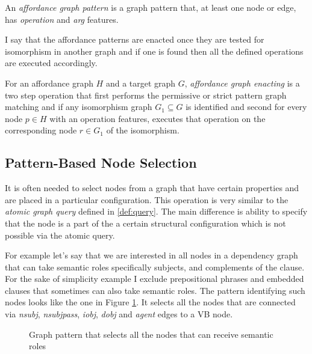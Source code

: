 \begin{definition}\label{def:affordance-pattern}
	An \textit{affordance graph pattern } is a graph pattern that, at least one node or edge, has \textit{operation} and \textit{arg} features.
\end{definition}

I say that the affordance patterns are enacted once they are tested for isomorphism in another graph and if one is found then all the defined operations are executed accordingly.

\begin{definition}\label{def:enacted-pattern}
	For an affordance graph $H$ and a target graph $G$, \textit{affordance graph enacting} is a two step operation that first performs the permissive or strict pattern graph matching and if any isomorphism graph $G_{1} \subseteq G$ is identified and second for every node $p \in H$ with an operation features, executes that operation on the corresponding node $r \in G_{1}$ of the isomorphism.  
\end{definition}

\subsection{Pattern-Based Node Selection}
It is often needed to select nodes from a graph that have certain properties and are placed in a particular configuration. This operation is very similar to the \textit{atomic graph query} defined in \ref{def:query}. The main difference is ability to specify that the node is a part of the a certain structural configuration which is not possible via the atomic query. 

For example let's say that we are interested in all nodes in a dependency graph that can take semantic roles specifically subjects, and complements of the clause. For the sake of simplicity example I exclude prepositional phrases and embedded clauses that sometimes can also take semantic roles. 
The pattern identifying such nodes looks like the one in Figure \ref{fig:gp3}. It selects all the nodes that are connected via \textit{nsubj}, \textit{nsubjpass}, \textit{iobj}, \textit{dobj} and \textit{agent} edges to a VB node. 

\begin{figure}[hbtp]
\centering
{}
\caption{Graph pattern that selects all the nodes that can receive semantic roles}
\label{fig:gp3}
\end{figure}

